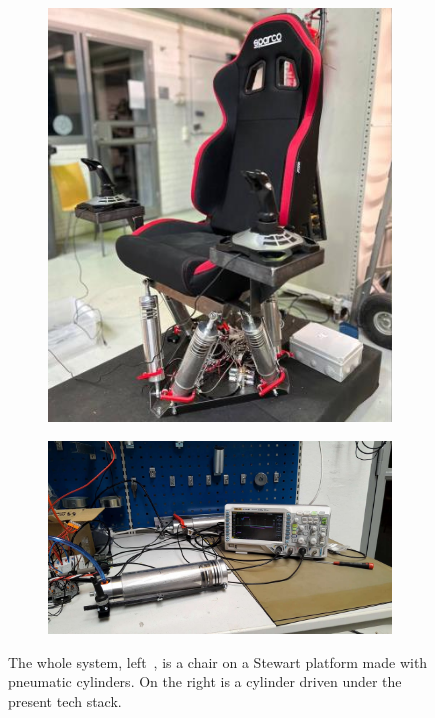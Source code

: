 \documentclass[english,12pt,a4paper,pdftex,eng,utf8]{aaltothesis}
\begin{document}
\begin{figure}[h]
  \centering
  \begin{subfigure}[t]{0.43\textwidth}
    \includegraphics[width=\textwidth]{assets/rocking_chair}
  \end{subfigure}
  \quad
  \begin{subfigure}[t]{0.53\textwidth}
    \includegraphics[width=\textwidth]{assets/pneumatic_cylinder_test}
  \end{subfigure}
  \caption{The whole system, left~\cite{Bjoerklund2023}, is a chair on a Stewart platform made with pneumatic cylinders.  On the right is a cylinder driven under the present tech stack.}\label{fig:stewart_platform_demo}
\end{figure}
\end{document}
